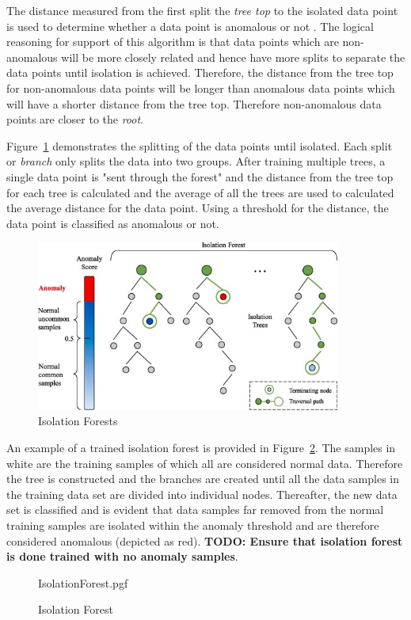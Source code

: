 The distance measured from the first split the \emph{tree top} to the isolated data point is used to determine whether a data point is anomalous or not \cite{Hariri2021}. The logical reasoning for support of this algorithm is that data points which are non-anomalous will be more closely related and hence have more splits to separate the data points until isolation is achieved. Therefore, the distance from the tree top for non-anomalous data points will be longer than anomalous data points which will have a shorter distance from the tree top. Therefore non-anomalous data points are closer to the \emph{root}. 

Figure~\ref{Figure-Isolation_Forest} demonstrates the splitting of the data points until isolated. Each split or \emph{branch} only splits the data into two groups. After training multiple trees, a single data point is "sent through the forest" and the distance from the tree top for each tree is calculated and the average of all the trees are used to calculated the average distance for the data point. Using a threshold for the distance, the data point is classified as anomalous or not.

\begin{figure}[h!tb]
	\centering
	
	\includegraphics[width=10cm]{fig/Isolation_Forests} %
	
	\caption[Isolation Forest]{Isolation Forests \cite{Chen2020}}
	\label{Figure-Isolation_Forest} 
\end{figure}

An example of a trained isolation forest is provided in Figure~\ref{fig:IsolationForest}. The samples in white are the training samples of which all are considered normal data. Therefore the tree is constructed and the branches are created until all the data samples in the training data set are divided into individual nodes. Thereafter, the new data set is classified and is evident that data samples far removed from the normal training samples are isolated within the anomaly threshold and are therefore considered anomalous (depicted as red). \textbf{TODO: Ensure that isolation forest is done trained with no anomaly samples}.
\begin{figure}[!hbt]
	\centering
	{IsolationForest.pgf}
	\caption{Isolation Forest}
	\label{fig:IsolationForest}
\end{figure}

